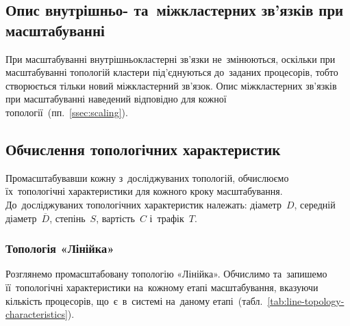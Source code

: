 \documentclass[
	a4paper,
	oneside,
	BCOR = 10mm,
	DIV = 12,
	12pt,
	headings = normal,
]{scrartcl}
\begin{document}
		\subsection{Опис внутрішньо- та~міжкластерних зв'язків при масштабуванні}
			При масштабуванні внутрішньокластерні зв'язки не~змінюються, оскільки при масштабуванні топологій кластери під'єднуються до~заданих процесорів, тобто створюється тільки новий міжкластерний зв'язок. Опис міжкластерних зв'язків при масштабуванні наведений відповідно для кожної топології~(пп.~\ref{ssec:scaling}).

		\subsection{Обчислення топологічних характеристик}
			Промасштабувавши кожну з~досліджуваних топологій, обчислюємо їх~топологічні характеристики для кожного кроку масштабування. До~досліджуваних топологічних характеристик належать: діаметр~$D$, середній діаметр~$\overline{D}$, степінь~$S$, вартість~$C$ і~трафік~$T$.

			\subsubsection{Топологія «Лінійка»}
				Розглянемо промасштабовану топологію «Лінійка». Обчислимо та~запишемо її~топологічні характеристики на~кожному етапі масштабування, вказуючи кількість процесорів, що~є~в~системі на~даному етапі~(табл.~\ref{tab:line-topology-characteristics}).
\end{document}
